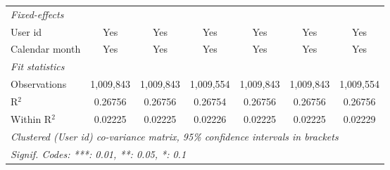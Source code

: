 \begin{table}[htbp]
\begin{threeparttable}[b]
\begin{tabular}{lcccccc}
         \midrule
         \emph{Fixed-effects}\\
         User id                        & Yes                  & Yes                  & Yes                  & Yes                  & Yes                  & Yes\\  
         Calendar month                 & Yes                  & Yes                  & Yes                  & Yes                  & Yes                  & Yes\\  
         \midrule
         \emph{Fit statistics}\\
         Observations                   & 1,009,843            & 1,009,843            & 1,009,554            & 1,009,843            & 1,009,843            & 1,009,554\\  
         R$^2$                          & 0.26756              & 0.26756              & 0.26754              & 0.26756              & 0.26756              & 0.26756\\  
         Within R$^2$                   & 0.02225              & 0.02225              & 0.02226              & 0.02225              & 0.02225              & 0.02229\\  
         \midrule \midrule
         \multicolumn{7}{l}{\emph{Clustered (User id) co-variance matrix, 95\% confidence intervals in brackets}}\\
         \multicolumn{7}{l}{\emph{Signif. Codes: ***: 0.01, **: 0.05, *: 0.1}}\\
      \end{tabular}
   \end{threeparttable}
\end{table}


